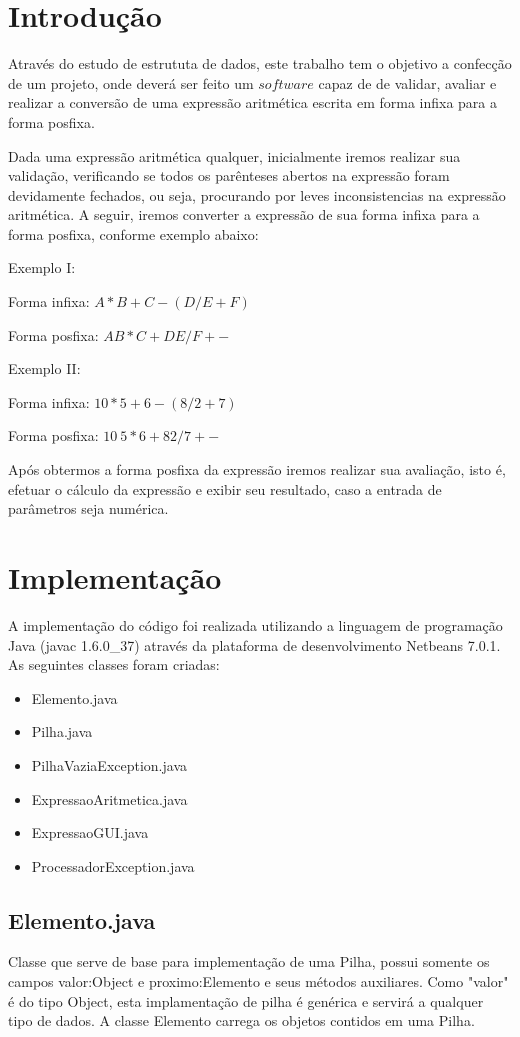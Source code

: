 \documentclass[a4paper,11pt]{article}
\begin{document}
\section{Introdução} 
Através do estudo de estrututa de dados, este trabalho tem o objetivo a confecção de um projeto, onde deverá ser feito um $software$ capaz de de validar, avaliar e realizar a conversão de uma expressão aritmética escrita em forma infixa para a forma posfixa.

Dada uma expressão aritmética qualquer, inicialmente iremos realizar sua validação, verificando se todos os parênteses abertos na expressão foram devidamente fechados, ou seja, procurando por leves inconsistencias na expressão aritmética. 
A seguir, iremos converter a expressão de sua forma infixa para a forma posfixa, conforme exemplo abaixo:

Exemplo I:

Forma infixa: \(A*B+C-(D/E+F)\)

Forma posfixa: \(A B*C+D E/F+-\)

Exemplo II:

Forma infixa: \(10*5+6-(8/2+7)\)

Forma posfixa: \(10\ 5* 6+ 8 2/7 +-\)

Após obtermos a forma posfixa da expressão iremos realizar sua avaliação, isto é, efetuar o cálculo da expressão e exibir seu resultado, caso a entrada de parâmetros seja numérica.

\section{Implementação}
A implementação do código foi realizada utilizando a linguagem de programação Java (javac 1.6.0\_37) através da plataforma de desenvolvimento Netbeans 7.0.1.\\

As seguintes classes foram criadas:
\begin{itemize}
  \item Elemento.java
  \item Pilha.java
  \item PilhaVaziaException.java
  \item ExpressaoAritmetica.java
  \item ExpressaoGUI.java
  \item ProcessadorException.java
\end{itemize}

\subsection{Elemento.java}
Classe que serve de base para implementação de uma Pilha, possui somente os campos valor:Object e proximo:Elemento e seus métodos auxiliares. Como "valor" é do tipo Object, esta implamentação de pilha é genérica e servirá a qualquer tipo de dados.
A classe Elemento carrega os objetos contidos em uma Pilha.
\end{document}
